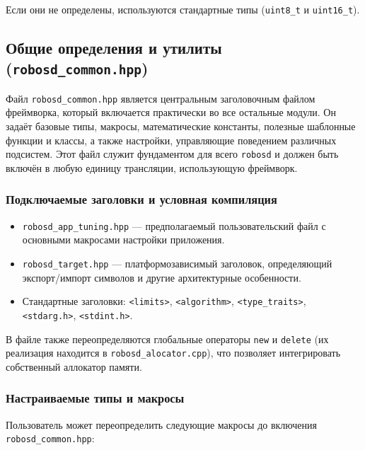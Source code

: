 \documentclass[a4paper,12pt]{article}
\begin{document}
Если они не определены, используются стандартные типы (\texttt{uint8\_t} и \texttt{uint16\_t}).

\subsection{Общие определения и утилиты (\texttt{robosd\_common.hpp})}

Файл \texttt{robosd\_common.hpp} является центральным заголовочным файлом фреймворка, который включается практически во все остальные модули. Он задаёт базовые типы, макросы, математические константы, полезные шаблонные функции и классы, а также настройки, управляющие поведением различных подсистем. Этот файл служит фундаментом для всего \texttt{robosd} и должен быть включён в любую единицу трансляции, использующую фреймворк.

\subsubsection{Подключаемые заголовки и условная компиляция}

\begin{itemize}
    \item \texttt{robosd\_app\_tuning.hpp} — предполагаемый пользовательский файл с основными макросами настройки приложения.
    \item \texttt{robosd\_target.hpp} — платформозависимый заголовок, определяющий экспорт/импорт символов и другие архитектурные особенности.
    \item Стандартные заголовки: \texttt{<limits>}, \texttt{<algorithm>}, \texttt{<type\_traits>}, \texttt{<stdarg.h>}, \texttt{<stdint.h>}.
\end{itemize}

В файле также переопределяются глобальные операторы \texttt{new} и \texttt{delete} (их реализация находится в \texttt{robosd\_alocator.cpp}), что позволяет интегрировать собственный аллокатор памяти.

\subsubsection{Настраиваемые типы и макросы}

Пользователь может переопределить следующие макросы до включения \texttt{robosd\_common.hpp}:
\end{document}
